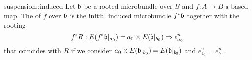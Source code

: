 \begin{mydefinition}{suspension::induced}
    Let $\mathfrak{b}$ be a rooted microbundle over $B$ and $f: A \to B$ a based map.
    The  of $f$ over $\mathfrak{b}$ is the initial induced microbundle $f^*\mathfrak{b}$ together with the rooting
    \[ f^*R: E(f^*\mathfrak{b}\vert_{a_0}) = a_0 \times E(\mathfrak{b}\vert_{b_0}) \Rightarrow{} e^n_{a_0} \]
    that coincides with $R$ if we consider $a_0 \times E(\mathfrak{b}\vert_{b_0}) = E(\mathfrak{b}\vert_{b_0})$ and $e^n_{a_0} = e^n_{b_0}$.
\end{mydefinition}